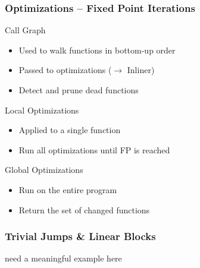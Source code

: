 \documentclass[navbaroff,en]{sdqbeamer}
\begin{document}
\begin{frame}
    \frametitle{Optimizations -- Fixed Point Iterations}

	\begin{contentblock}{Call Graph}
		\begin{itemize}
			\item Used to walk functions in bottom-up order
			\item Passed to optimizations ($\rightarrow$ Inliner)
			\item Detect and prune dead functions
		\end{itemize}
	\end{contentblock}

	\begin{contentblock}{Local Optimizations}
		\begin{itemize}
			\item Applied to a single function
			\item Run all optimizations until FP is reached
		\end{itemize}
	\end{contentblock}

	\begin{contentblock}{Global Optimizations}
		\begin{itemize}
			\item Run on the entire program
			\item Return the set of changed functions
		\end{itemize}
	\end{contentblock}

\end{frame}

\begin{frame}
    \frametitle{Trivial Jumps \& Linear Blocks}

	\Huge need a meaningful example here

\end{frame}



\end{document}
